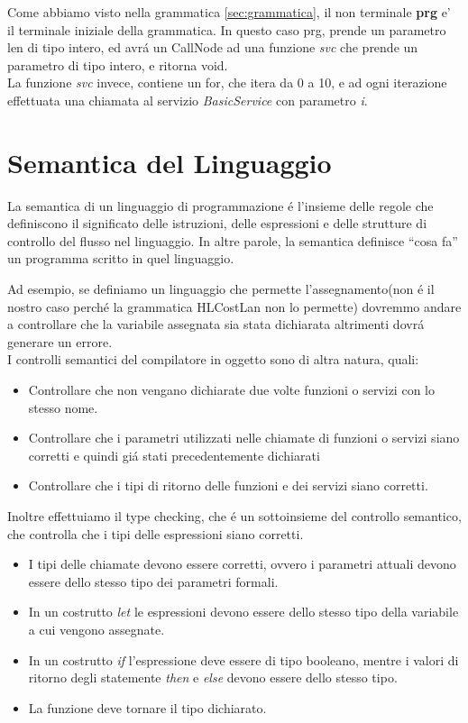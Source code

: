 \documentclass[../../main.tex]{subfiles}
\begin{document}
Come abbiamo visto nella grammatica \ref{sec:grammatica}, il non terminale \textbf{prg} e' il terminale iniziale della grammatica. In questo caso prg, prende un parametro len di tipo intero, ed avrá un CallNode ad una funzione \textit{svc} che prende un parametro di tipo intero, e ritorna void.\\
La funzione \textit{svc} invece, contiene un for, che itera da 0 a 10, e ad ogni iterazione effettuata una chiamata al servizio \textit{BasicService} con parametro \textit{i}.\\

\section{Semantica del Linguaggio}\label{sec:semantica}
La semantica di un linguaggio di programmazione é l'insieme delle regole che definiscono il significato delle istruzioni, delle espressioni e delle strutture di controllo del flusso nel linguaggio. In altre parole, la semantica definisce ``cosa fa'' un programma scritto in quel linguaggio.

Ad esempio, se definiamo un linguaggio che permette l'assegnamento(non é il nostro caso perché la grammatica HLCostLan non lo permette) dovremmo andare a controllare che la variabile assegnata sia stata dichiarata altrimenti dovrá generare un errore.\\
I controlli semantici del compilatore in oggetto sono di altra natura, quali:
\begin{itemize}
    \item Controllare che non vengano dichiarate due volte funzioni o servizi con lo stesso nome.
    \item Controllare che i parametri utilizzati nelle chiamate di funzioni o servizi siano corretti e quindi giá stati precedentemente dichiarati
    \item Controllare che i tipi di ritorno delle funzioni e dei servizi siano corretti.
\end{itemize}
Inoltre effettuiamo il type checking, che é un sottoinsieme del controllo semantico, che controlla che i tipi delle espressioni siano corretti.\\
\begin{itemize}
    \item I tipi delle chiamate devono essere corretti, ovvero i parametri attuali devono essere dello stesso tipo dei parametri formali.
    \item In un costrutto \textit{let} le espressioni devono essere dello stesso tipo della variabile a cui vengono assegnate.
    \item In un costrutto \textit{if} l'espressione deve essere di tipo booleano, mentre i valori di ritorno degli statemente \textit{then} e \textit{else} devono essere dello stesso tipo.
    \item La funzione deve tornare il tipo dichiarato.
\end{itemize}
\end{document}
